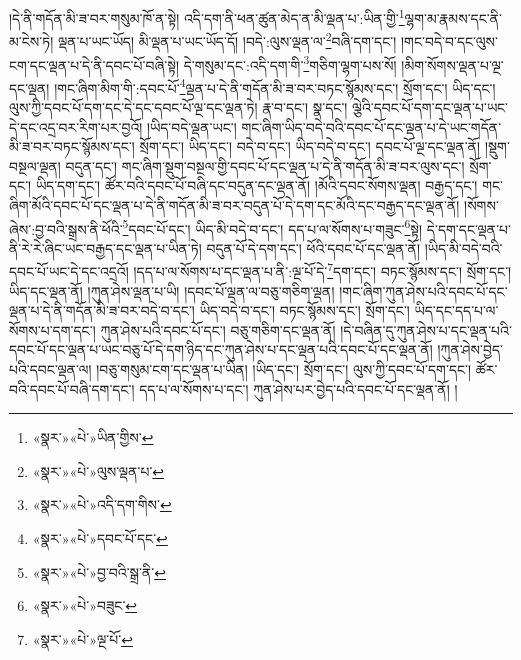 །དེ་ནི་གདོན་མི་ཟ་བར་གསུམ་ཁོ་ན་སྟེ། འདི་དག་ནི་ཕན་ཚུན་མེད་ན་མི་ལྡན་པ་:ཡིན་གྱི་\footnote{«སྣར་»«པེ་»ཡིན་གྱིས་}ལྷག་མ་རྣམས་དང་ནི་མ་ངེས་ཏེ། ལྡན་པ་ཡང་ཡོད། མི་ལྡན་པ་ཡང་ཡོད་དོ། །བདེ་:ལུས་ལྡན་ལ་\footnote{«སྣར་»«པེ་»ལུས་ལྡན་པ་}བཞི་དག་དང་། །གང་བདེ་བ་དང་ལུས་ངག་དང་ལྡན་པ་དེ་ནི་དབང་པོ་བཞི་སྟེ། དེ་གསུམ་དང་:འདི་དག་གི་\footnote{«སྣར་»«པེ་»འདི་དག་གིས་}གཅིག་ལྷག་པས་སོ། །མིག་སོགས་ལྡན་པ་ལྔ་དང་ལྡན། །གང་ཞིག་མིག་གི་:དབང་པོ་\footnote{«སྣར་»«པེ་»དབང་པོ་དང་}ལྡན་པ་དེ་ནི་གདོན་མི་ཟ་བར་བཏང་སྙོམས་དང་། སྲོག་དང་། ཡིད་དང་། ལུས་ཀྱི་དབང་པོ་དག་དང་དེ་དང་དབང་པོ་ལྔ་དང་ལྡན་ཏེ། རྣ་བ་དང་། སྣ་དང་། ལྕེའི་དབང་པོ་དག་དང་ལྡན་པ་ཡང་དེ་དང་འདྲ་བར་རིག་པར་བྱའོ། །ཡིད་བདེ་ལྡན་ཡང་། གང་ཞིག་ཡིད་བདེ་བའི་དབང་པོ་དང་ལྡན་པ་དེ་ཡང་གདོན་མི་ཟ་བར་བཏང་སྙོམས་དང་། སྲོག་དང་། ཡིད་དང་། བདེ་བ་དང་། ཡིད་བདེ་བ་དང་། དབང་པོ་ལྔ་དང་ལྡན་ནོ། །སྡུག་བསྔལ་ལྡན། བདུན་དང་། གང་ཞིག་སྡུག་བསྔལ་གྱི་དབང་པོ་དང་ལྡན་པ་དེ་ནི་གདོན་མི་ཟ་བར་ལུས་དང་། སྲོག་དང་། ཡིད་དག་དང་། ཚོར་བའི་དབང་པོ་བཞི་དང་བདུན་དང་ལྡན་ནོ། །མོའི་དབང་སོགས་ལྡན། བརྒྱད་དང་། གང་ཞིག་མོའི་དབང་པོ་དང་ལྡན་པ་དེ་ནི་གདོན་མི་ཟ་བར་བདུན་པོ་དེ་དག་དང་མོའི་དང་བརྒྱད་དང་ལྡན་ནོ། །སོགས་ཞེས་:བྱ་བའི་སྒྲས་ནི་ཕོའི་\footnote{«སྣར་»«པེ་»བྱ་བའི་སྒྲ་ནི་}དབང་པོ་དང་། ཡིད་མི་བདེ་བ་དང་། དད་པ་ལ་སོགས་པ་གཟུང་\footnote{«སྣར་»«པེ་»བཟུང་}སྟེ། དེ་དག་དང་ལྡན་པ་ནི་རེ་རེ་ཞིང་ཡང་བརྒྱད་དང་ལྡན་པ་ཡིན་ཏེ། བདུན་པོ་དེ་དག་དང་། ཕོའི་དབང་པོ་དང་ལྡན་ནོ། །ཡིད་མི་བདེ་བའི་དབང་པོ་ཡང་དེ་དང་འདྲའོ། །དད་པ་ལ་སོགས་པ་དང་ལྡན་པ་ནི་:ལྔ་པོ་དེ་\footnote{«སྣར་»«པེ་»ལྔ་པོ་}དག་དང་། བཏང་སྙོམས་དང་། སྲོག་དང་། ཡིད་དང་ལྡན་ནོ། །ཀུན་ཤེས་ལྡན་པ་ཡི། །དབང་པོ་ལྡན་ལ་བཅུ་གཅིག་ལྡན། །གང་ཞིག་ཀུན་ཤེས་པའི་དབང་པོ་དང་ལྡན་པ་དེ་ནི་གདོན་མི་ཟ་བར་བདེ་བ་དང་། ཡིད་བདེ་བ་དང་། བཏང་སྙོམས་དང་། སྲོག་དང་། ཡིད་དང་དད་པ་ལ་སོགས་པ་དག་དང་། ཀུན་ཤེས་པའི་དབང་པོ་དང་། བཅུ་གཅིག་དང་ལྡན་ནོ། །དེ་བཞིན་དུ་ཀུན་ཤེས་པ་དང་ལྡན་པའི་དབང་པོ་དང་ལྡན་པ་ཡང་བཅུ་པོ་དེ་དག་ཉིད་དང་ཀུན་ཤེས་པ་དང་ལྡན་པའི་དབང་པོ་དང་ལྡན་ནོ། །ཀུན་ཤེས་བྱེད་པའི་དབང་ལྡན་ལ། །བཅུ་གསུམ་ངག་དང་ལྡན་པ་ཡིན། །ཡིད་དང་། སྲོག་དང་། ལུས་ཀྱི་དབང་པོ་དག་དང་། ཚོར་བའི་དབང་པོ་བཞི་དག་དང་། དད་པ་ལ་སོགས་པ་དང་། ཀུན་ཤེས་པར་བྱེད་པའི་དབང་པོ་དང་ལྡན་ནོ། །
